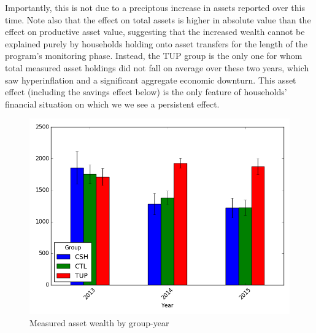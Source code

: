 \documentclass[12pt,article]{article}
\begin{document}
Importantly, this is not due to a preciptous increase in assets reported over this
time. Note also that the effect on total assets is higher in absolute value than the
effect on productive asset value, suggesting that the increased wealth cannot be
explained purely by households holding onto asset transfers for the length of the
program's monitoring phase. Instead, the TUP group is the only one for whom total
measured asset holdings did not fall on average over these two years, which saw
hyperinflation and a significant aggregate economic downturn. This asset effect
(including the savings effect below) is the only feature of households' financial
situation on which we we see a persistent effect.

\begin{figure}[htb]
\centering
\includegraphics[width=.9\linewidth]{../figures/AssetTotal_groupyear.png}
\caption{\label{fig:AssetTotal}Measured asset wealth by group-year}
\end{figure} 
\end{document}
